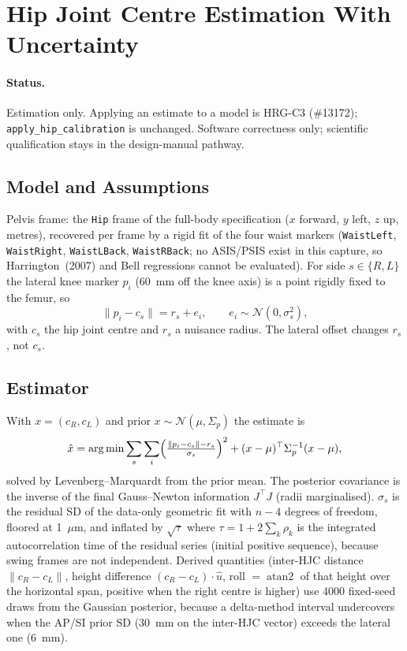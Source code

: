 \section{Hip Joint Centre Estimation With Uncertainty}
\label{sec:hrg-hjc-map}

\paragraph{Status.} Estimation only. Applying an estimate to a model is HRG-C3
(\#13172); \texttt{apply\_hip\_calibration} is unchanged. Software correctness
only; scientific qualification stays in the design-manual pathway.

\subsection{Model and Assumptions}
Pelvis frame: the \texttt{Hip} frame of the full-body specification
($x$ forward, $y$ left, $z$ up, metres), recovered per frame by a rigid fit of
the four waist markers (\texttt{WaistLeft}, \texttt{WaistRight},
\texttt{WaistLBack}, \texttt{WaistRBack}; no ASIS/PSIS exist in this capture,
so Harrington~(2007) and Bell regressions cannot be evaluated). For side
$s\in\{R,L\}$ the lateral knee marker $p_i$ (60~mm off the knee axis) is a
point rigidly fixed to the femur, so
\begin{equation}
  \lVert p_i - c_s\rVert = r_s + e_i,\qquad e_i\sim\mathcal N(0,\sigma_s^2),
\end{equation}
with $c_s$ the hip joint centre and $r_s$ a nuisance radius. The lateral
offset changes $r_s$, not $c_s$.

\subsection{Estimator}
With $x=(c_R,c_L)$ and prior $x\sim\mathcal N(\mu,\Sigma_p)$ the estimate is
\begin{equation}
  \hat x = \arg\min \sum_s\sum_i\Bigl(\tfrac{\lVert p_i-c_s\rVert-r_s}{\sigma_s}\Bigr)^2
  + (x-\mu)^\top\Sigma_p^{-1}(x-\mu),
\end{equation}
solved by Levenberg--Marquardt from the prior mean. The posterior covariance is
the inverse of the final Gauss--Newton information $J^\top J$ (radii marginalised).
$\sigma_s$ is the residual SD of the data-only geometric fit with $n-4$ degrees of
freedom, floored at 1~$\mu$m, and inflated by $\sqrt{\tau}$ where $\tau=1+2\sum_k\rho_k$
is the integrated autocorrelation time of the residual series (initial positive
sequence), because swing frames are not independent. Derived quantities
(inter-HJC distance $\lVert c_R-c_L\rVert$, height difference $(c_R-c_L)\cdot\hat u$,
roll $=\operatorname{atan2}$ of that height over the horizontal span, positive when
the right centre is higher) use 4000 fixed-seed draws from the Gaussian posterior,
because a delta-method interval undercovers when the AP/SI prior SD (30~mm on the
inter-HJC vector) exceeds the lateral one (6~mm).

